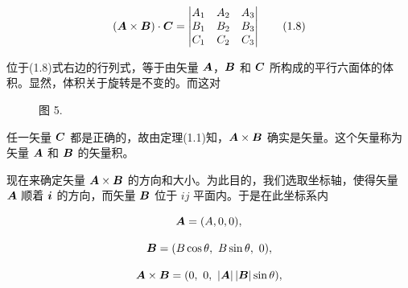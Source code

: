 \begin{equation}
(\bm{A} \times \bm{B}) \cdot \bm{C} =
\begin{vmatrix}
A_1 & A_2 & A_3\\
B_1 & B_2 & B_3\\
C_1 & C_2 & C_3
\end{vmatrix}
\tag{1.8}
\end{equation}

位于(1.8)式右边的行列式，等于由矢量 $\bm{A}$，$\bm{B}$ 和 $\bm{C}$ 所构成的平行六面体的体积。显然，体积关于旋转是不变的。而这对

\begin{figure}[htbp]
\centering
{}
\par\vspace{2pt}
{\small 图 5.}
\end{figure}

任一矢量 $\bm{C}$ 都是正确的，故由定理(1.1)知，$\bm{A} \times \bm{B}$ 确实是矢量。这个矢量称为矢量 $\bm{A}$ 和 $\bm{B}$ 的矢量积。

现在来确定矢量 $\bm{A} \times \bm{B}$ 的方向和大小。为此目的，我们选取坐标轴，使得矢量 $\bm{A}$ 顺着 $\bm{i}$ 的方向，而矢量 $\bm{B}$ 位于 $ij$ 平面内。于是在此坐标系内

\begin{equation*}
\bm{A} = (A, 0, 0),
\end{equation*}

\begin{equation*}
\ve{B} = (B \cos\theta,\ B \sin\theta,\ 0),
\end{equation*}

\begin{equation*}
\ve{A} \times \ve{B} = (0,\ 0,\ |\ve{A}|\,|\ve{B}| \sin\theta),
\end{equation*}

